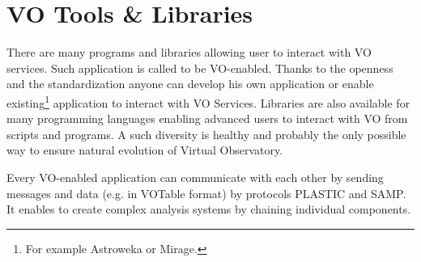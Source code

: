 \section{VO Tools \& Libraries}
There are many programs and libraries allowing user to interact with
VO services. Such application is called to be VO-enabled. Thanks to
the openness and the standardization anyone can develop his own
application or enable existing\footnote{For example Astroweka or
  Mirage.} application to interact with VO Services. Libraries are
also available for many programming languages enabling advanced users
to interact with VO from scripts and programs. A such diversity is
healthy and probably the only possible way to ensure natural evolution
of Virtual Observatory.

Every VO-enabled application can communicate with each other by
sending messages and data (e.g. in VOTable format) by protocols
PLASTIC and SAMP. It enables to create complex analysis systems by
chaining individual components.






